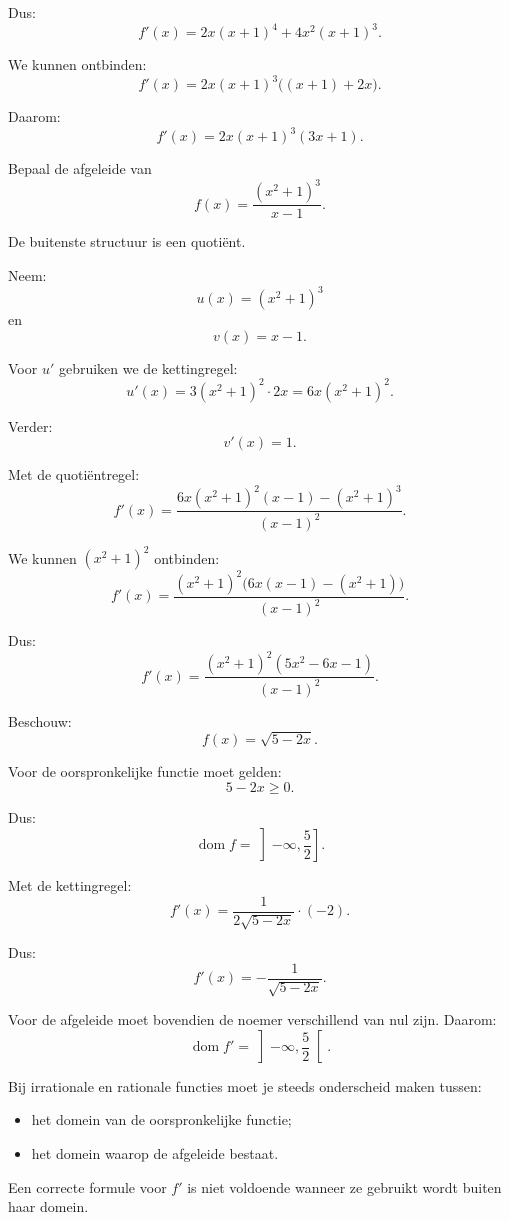\documentclass{ximera}
\begin{document}
Dus:
\[
f'(x)
=
2x(x+1)^4
+
4x^2(x+1)^3.
\]

We kunnen ontbinden:
\[
f'(x)
=
2x(x+1)^3\bigl((x+1)+2x\bigr).
\]

Daarom:
\[\boxed{f'(x)=2x(x+1)^3(3x+1).}\]


\begin{voorbeeld}
Bepaal de afgeleide van
\[f(x)=\frac{(x^2+1)^3}{x-1}.\]

De buitenste structuur is een quotiënt.

Neem:
\[u(x)=(x^2+1)^3\]
en
\[v(x)=x-1.\]

Voor $u'$ gebruiken we de kettingregel:
\[u'(x)=3(x^2+1)^2\cdot2x=6x(x^2+1)^2.\]

Verder:
\[v'(x)=1.\]

Met de quotiëntregel:
\[
f'(x)
=
\frac{6x(x^2+1)^2(x-1)-(x^2+1)^3}{(x-1)^2}.
\]

We kunnen $(x^2+1)^2$ ontbinden:
\[
f'(x)
=
\frac{(x^2+1)^2\bigl(6x(x-1)-(x^2+1)\bigr)}
     {(x-1)^2}.
\]

Dus:
\[\boxed{f'(x)=
\frac{(x^2+1)^2(5x^2-6x-1)}
     {(x-1)^2}.}\]
\end{voorbeeld}




Beschouw:
\[f(x)=\sqrt{5-2x}.\]

Voor de oorspronkelijke functie moet gelden:
\[5-2x\geq0.\]

Dus:
\[\operatorname{dom}f=\left]-\infty,\frac52\right].\]

Met de kettingregel:
\[
f'(x)
=
\frac{1}{2\sqrt{5-2x}}\cdot(-2).
\]

Dus:
\[\boxed{f'(x)=-\frac{1}{\sqrt{5-2x}}.}\]

Voor de afgeleide moet bovendien de noemer verschillend van nul zijn.
Daarom:
\[\operatorname{dom}f'=\left]-\infty,\frac52\right[.\]


\begin{opmerking}
Bij irrationale en rationale functies moet je steeds onderscheid maken
tussen:

\begin{itemize}
  \item het domein van de oorspronkelijke functie;
  \item het domein waarop de afgeleide bestaat.
\end{itemize}

Een correcte formule voor $f'$ is niet voldoende wanneer ze gebruikt
wordt buiten haar domein.
\end{opmerking}
\end{document}
